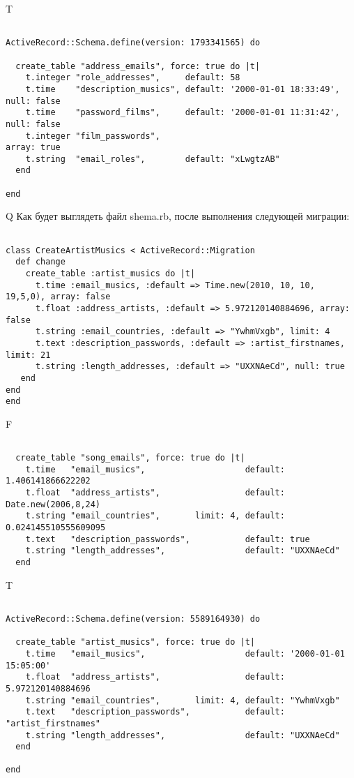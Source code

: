 T
\begin{verbatim}

ActiveRecord::Schema.define(version: 1793341565) do

  create_table "address_emails", force: true do |t|
    t.integer "role_addresses",     default: 58
    t.time    "description_musics", default: '2000-01-01 18:33:49', null: false
    t.time    "password_films",     default: '2000-01-01 11:31:42', null: false
    t.integer "film_passwords",                                                  array: true
    t.string  "email_roles",        default: "xLwgtzAB"
  end

end
\end{verbatim}

Q
Как будет выглядеть файл shema.rb, после выполнения следующей миграции:

\begin{verbatim}

class CreateArtistMusics < ActiveRecord::Migration 
  def change 
    create_table :artist_musics do |t| 
      t.time :email_musics, :default => Time.new(2010, 10, 10, 19,5,0), array: false
      t.float :address_artists, :default => 5.972120140884696, array: false
      t.string :email_countries, :default => "YwhmVxgb", limit: 4
      t.text :description_passwords, :default => :artist_firstnames, limit: 21
      t.string :length_addresses, :default => "UXXNAeCd", null: true
   end
end
end
\end{verbatim}

F
\begin{verbatim}

  create_table "song_emails", force: true do |t|
    t.time   "email_musics",                    default: 1.406141866622202
    t.float  "address_artists",                 default: Date.new(2006,8,24)
    t.string "email_countries",       limit: 4, default: 0.024145510555609095
    t.text   "description_passwords",           default: true
    t.string "length_addresses",                default: "UXXNAeCd"
  end

\end{verbatim}

T
\begin{verbatim}

ActiveRecord::Schema.define(version: 5589164930) do

  create_table "artist_musics", force: true do |t|
    t.time   "email_musics",                    default: '2000-01-01 15:05:00'
    t.float  "address_artists",                 default: 5.972120140884696
    t.string "email_countries",       limit: 4, default: "YwhmVxgb"
    t.text   "description_passwords",           default: "artist_firstnames"
    t.string "length_addresses",                default: "UXXNAeCd"
  end

end
\end{verbatim}


